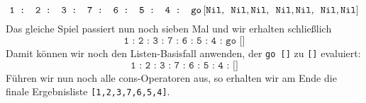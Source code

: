 \documentclass[ngerman, a4paper, 11pt]{article}
\theoremstyle{nonumberplain}
\begin{document}
\begin{equation*}
	\texttt{1 : 2 : 3 : 7 : 6 : 5 : 4 : go} \left[ 
	\texttt{Nil}, \enskip
	\texttt{Nil}, \texttt{Nil}, \enskip
	\texttt{Nil}, \texttt{Nil}, \enskip
	\texttt{Nil}, \texttt{Nil}
	\right]
\end{equation*}
Das gleiche Spiel passiert nun noch sieben Mal und wir erhalten schließlich
\begin{equation*}
	\texttt{1 : 2 : 3 : 7 : 6 : 5 : 4 : go []}
\end{equation*}
Damit können wir noch den Listen-Basisfall anwenden, der \texttt{go []} zu \texttt{[]} evaluiert:
\begin{equation*}
	\texttt{1 : 2 : 3 : 7 : 6 : 5 : 4 : []} 
\end{equation*}
Führen wir nun noch alle cons-Operatoren aus, so erhalten wir am Ende die finale Ergebnisliste \texttt{[1,2,3,7,6,5,4]}.
\end{document}
